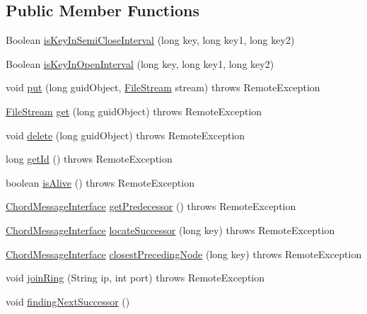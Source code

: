 \subsection*{Public Member Functions}
\begin{DoxyCompactItemize}
\item 
Boolean \mbox{\hyperlink{class_chord_aa0b073bf26ea53ee4c36749b5bde4935}{is\+Key\+In\+Semi\+Close\+Interval}} (long key, long key1, long key2)
\item 
Boolean \mbox{\hyperlink{class_chord_a68c9c3d06da58a6a32aa536751d6a221}{is\+Key\+In\+Open\+Interval}} (long key, long key1, long key2)
\item 
void \mbox{\hyperlink{class_chord_a9eb609c00b8f2eddb6e59981d2ff0963}{put}} (long guid\+Object, \mbox{\hyperlink{class_file_stream}{File\+Stream}} stream)  throws Remote\+Exception 
\item 
\mbox{\hyperlink{class_file_stream}{File\+Stream}} \mbox{\hyperlink{class_chord_af273d965e3657c05bd7edcc9f956da23}{get}} (long guid\+Object)  throws Remote\+Exception
\item 
void \mbox{\hyperlink{class_chord_a8bc6bdc9f92665955ae6907f15cc7ea6}{delete}} (long guid\+Object)  throws Remote\+Exception 
\item 
long \mbox{\hyperlink{class_chord_a3dfb600d109b7d23459a3353af0274a9}{get\+Id}} ()  throws Remote\+Exception 
\item 
boolean \mbox{\hyperlink{class_chord_a0a677ced19cc0cb5afd2a695977aeb95}{is\+Alive}} ()  throws Remote\+Exception 
\item 
\mbox{\hyperlink{interface_chord_message_interface}{Chord\+Message\+Interface}} \mbox{\hyperlink{class_chord_a3f1aadce3820e808c80662bb61a58e34}{get\+Predecessor}} ()  throws Remote\+Exception 
\item 
\mbox{\hyperlink{interface_chord_message_interface}{Chord\+Message\+Interface}} \mbox{\hyperlink{class_chord_a7e354ea388d048d4910fa28b182ebe9f}{locate\+Successor}} (long key)  throws Remote\+Exception 
\item 
\mbox{\hyperlink{interface_chord_message_interface}{Chord\+Message\+Interface}} \mbox{\hyperlink{class_chord_aecd3971877558c3b1290bd49d7576ab0}{closest\+Preceding\+Node}} (long key)  throws Remote\+Exception 
\item 
void \mbox{\hyperlink{class_chord_ace0b8d2768590d7527af155c6573cae7}{join\+Ring}} (String ip, int port)  throws Remote\+Exception 
\item 
void \mbox{\hyperlink{class_chord_a65c855dc1d8c6a82545899cb823dba2e}{finding\+Next\+Successor}} ()

\end{DoxyCompactItemize}
